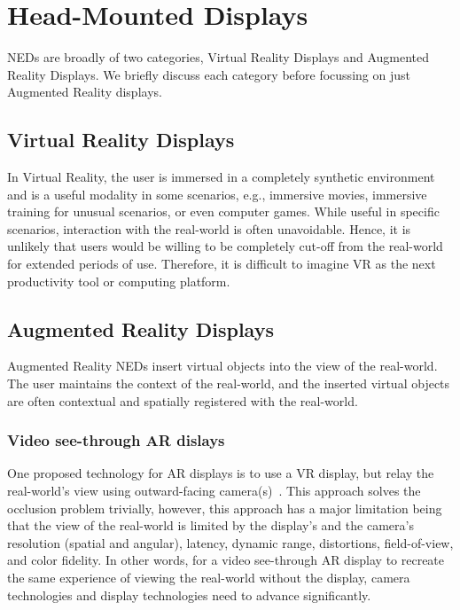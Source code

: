 \section{Head-Mounted Displays}
NEDs are broadly of two categories, Virtual Reality Displays and Augmented Reality Displays. 
We briefly discuss each category before focussing on just Augmented Reality displays.

\subsection{Virtual Reality Displays}
\label{sec:background:vr_displays}
In Virtual Reality, the user is immersed in a completely synthetic environment and is a useful modality in some scenarios, e.g., immersive movies, immersive training for unusual scenarios, or even computer games. 
While useful in specific scenarios, interaction with the real-world is often unavoidable. 
Hence, it is unlikely that users would be willing to be completely cut-off from the real-world for extended periods of use. 
Therefore, it is difficult to imagine VR as the next productivity tool or computing platform.

\subsection{Augmented Reality Displays}
\label{sec:background:ar_displays}
Augmented Reality NEDs insert virtual objects into the view of the real-world. 
The user maintains the context of the real-world, and the inserted virtual objects are often contextual and spatially registered with the real-world.

\subsubsection{Video see-through AR dislays}
\label{sec:background:vst_displays}
One proposed technology for AR displays is to use a VR display, but relay the real-world’s view using outward-facing camera(s)~\cite{Rolland2000,kanbara2000stereoscopic,state2005simulation}. 
This approach solves the occlusion problem trivially, however, this approach has a major limitation being that the view of the real-world is limited by the display’s and the camera’s resolution (spatial and angular), latency, dynamic range, distortions, field-of-view, and color fidelity. 
In other words, for a video see-through AR display to recreate the same experience of viewing the real-world without the display, camera technologies and display technologies need to advance significantly.

